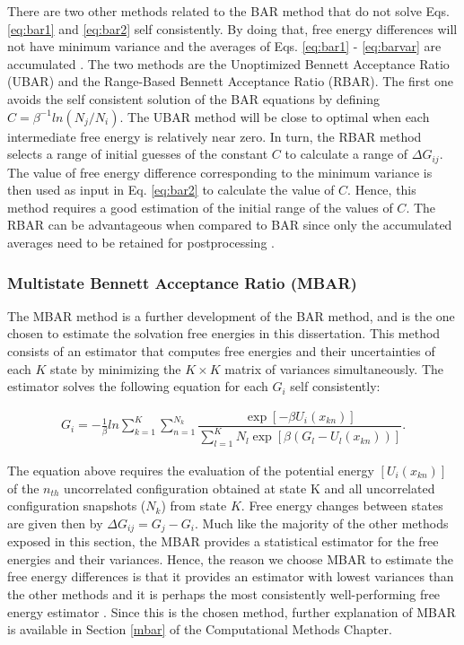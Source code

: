 There are two other methods related to the BAR method that do not solve Eqs. \eqref{eq:bar1} and \eqref{eq:bar2} self consistently. By doing that, free energy differences will not have minimum variance and the averages of Eqs. \eqref{eq:bar1} - \eqref{eq:barvar} are accumulated \cite{bareva}. The two methods are the Unoptimized Bennett Acceptance Ratio (UBAR) and the Range-Based Bennett Acceptance Ratio (RBAR). The first one avoids the self consistent solution of the BAR equations by defining $C=\beta^{-1}ln(N_{j}/N_{i})$. The UBAR method will be close to optimal when each intermediate free energy is relatively near zero. In turn, the RBAR method selects a range of initial guesses of the constant $C$ to calculate a range of $\Delta G_{ij}$. The value of free energy difference corresponding to the minimum variance is then used as input in Eq. \eqref{eq:bar2} to calculate the value of $C$. Hence, this method requires a good estimation of the initial range of the values of $C$. The RBAR can be advantageous when compared to BAR since only the accumulated averages need to be retained for postprocessing \cite{bareva}.  

\subsubsection{Multistate Bennett Acceptance Ratio (MBAR)}

The MBAR method \cite{mbar} is a further development of the BAR method, and is the one chosen to estimate the solvation free energies in this dissertation. This method consists of an estimator that computes free energies and their uncertainties of each $K$ state by minimizing the $K \times K$ matrix of variances simultaneously. The estimator solves the following equation for each $G_{i}$ self consistently:


\begin{equation}
\label{eq:mbar}
\begin{aligned}
G_{i} = - \frac{1}{\beta}ln \sum_{k=1}^{K} \sum_{n=1}^{N_{k}}
\dfrac{\exp[-\beta U_{i}(x_{kn})]}{\sum_{l=1}^{K} N_{l} \exp[\beta (G_{l} - U_{l}(x_{kn}))]} .
\end{aligned}
\end{equation}

The equation above requires the evaluation of the potential energy $[U_{i}(x_{kn})]$ of  the $n_{th}$ uncorrelated configuration obtained at state K and  all uncorrelated configuration snapshots ($N_{k}$) from state $K$. Free energy changes between states are given then by $\Delta G_{ij} = G_{j} -  G_{i}$. Much like the majority of the other methods exposed in this section, the MBAR provides a statistical estimator for the free energies and their variances. Hence, the reason we choose MBAR to estimate the free energy differences is that it provides an estimator with lowest variances than the other methods and it is perhaps the most consistently well-performing free
energy estimator \cite{bareva}. Since this is the chosen method, further explanation of MBAR is available in Section \ref{mbar} of the Computational Methods Chapter.
